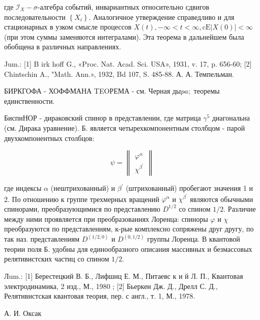 \documentclass[10pt]{article}
\begin{document}
где $\mathscr{I}_{X}-\sigma$-алгебра событий, инвариантных относительно сдвигов последовательности $\left\{X_{i}\right\}$. Аналогичное утверждение справедливо и для стационарных в узком смысле процессов $X(t),-\infty<t<\infty, \mathrm{c} \mathrm{E}|X(0)|<\infty$ (при этом суммы заменяются интегралами). Эта теорема в дальнейшем была обобщена в различных направлениях.



Jum.: [1] B irk hoff G., «Proc. Nat. Acad. Sci. USA», 1931, v. 17, p. 656-60; [2] Chintschin A., "Math. Ann.», 1932, Bd 107, S. 485-88. А. А. Темпельман.



БИРКГОФА - ХОФФМАНА TEOРЕМА - см. Черная ды$p a ;$ теоремы единственности.



БиспиНОР - дираковский спинор в представлении, где матрица $\gamma^{5}$ диагональна (см. Дирака уравнение). Б. является четырехкомпонентным столбцом - парой двухкомпонентных столбцов:



\[

\psi=\left\|\begin{array}{c}

\varphi^{\alpha} \\

\chi^{\beta^{\prime}}

\end{array}\right\|

\]



где индексы $\alpha$ (нештрихованный) и $\beta^{\prime}$ (штрихованный) пробегают значения 1 и 2. По отношению к группе трехмерных вращений $\varphi^{\alpha}$ и $\chi^{\beta^{\prime}}$ являются обычными спинорами, преобразующимися по представлению $D^{1 / 2}$ со спином $1 / 2$. Различие между ними проявляется при преобразованиях Лоренца: спиноры $\varphi$ и $\chi$ преобразуются по представлениям, к-рые комплексно сопряжены друг другу, по так наз. представлениям $D^{(1 / 2,0)}$ и $D^{(0,1 / 2)}$ группы Лоренца. В квантовой теории поля Б. удобны для единообразного описания массивных и безмассовых релятивистских частиц со спином $1 / 2$.



Лum.: [1] Берестецкий В. Б., Лифшиц Е. М., Питаевс к и й Л. П., Квантовая электродинамика, 2 изд., М., 1980 ; [2] Бьеркен Дж. Д., Дрелл С. Д., Релятивистская квантовая теория, пер. с англ., т. 1, М., 1978.



А. И. Оксак
\end{document}
